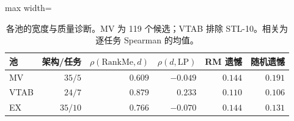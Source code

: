\begin{table}[htbp]
\centering\small
\caption{各池的宽度与质量诊断。MV 为 119 个候选；VTAB 排除 STL-10。相关为逐任务 Spearman 的均值。}
\label{tab:pool_diagnosis_zh}
\setlength{\tabcolsep}{4pt}
\begin{adjustbox}{max width=\linewidth}
\begin{tabular}{lrrrrr}
\toprule
池 & 架构/任务 & $\rho(\mathrm{RankMe},d)$ & $\rho(d,\mathrm{LP})$ & RM 遗憾 & 随机遗憾 \\
\midrule
MV & $35/5$ & $0.609$ & $-0.049$ & $0.144$ & $0.191$ \\
VTAB & $24/7$ & $0.879$ & $0.233$ & $0.110$ & $0.106$ \\
EX & $35/10$ & $0.766$ & $-0.070$ & $0.144$ & $0.131$ \\
\bottomrule
\end{tabular}
\end{adjustbox}
\end{table}
